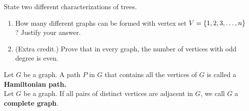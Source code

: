 \documentclass[10pt]{beamer}
\begin{document}
\begin{frame}
 
\begin{myredbox}[title=\text{Reading Quiz (Trees)}]
State two different characterizations of trees. 
\end{myredbox}

\vfill
\begin{mygreenbox}[title=\text{Problems Quiz (Graph fundamentals, subgraphs, connection)}]

\begin{enumerate}
	\item How many different graphs can be formed with vertex set $V=\{ {1,2,3,\hdots,n} \}$? Justify your answer. 
	\item (Extra credit.) Prove that in every graph, the number of vertices with odd degree is even. 
\end{enumerate}
\end{mygreenbox}
\vfill 
\begin{myyellowbox}[title=\text{Definitions (for reference)}]
Let $G$ be a graph. A path $P$ in $G$ that contains all the vertices of $G$ is called a \textbf{Hamiltonian path.}  \\

Let $G$ be a graph. If all pairs of distinct vertices are adjacent in $G$, we call $G$ a \textbf{complete graph}. 
\end{myyellowbox}
\end{frame}

\begin{frame}[standout]
\href{https://docs.google.com/document/d/1Aw7M0FXi0hPJNVsjJVT_8nUAOTVaNy-5B9RNVMiEQbs/edit?tab=t.0}{}
\end{frame}
\end{document}
